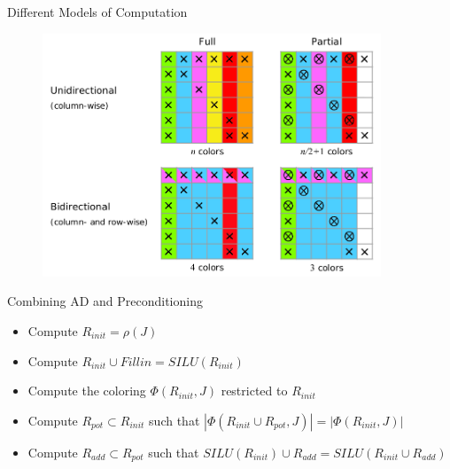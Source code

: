 \documentclass{beamer}
\begin{document}
\begin{frame}{Different Models of Computation}
\begin{figure}
\centering
\includegraphics[width=0.9\textwidth]{fullvsPart}
\end{figure}
\end{frame}

\begin{frame}{Combining AD and Preconditioning}
\begin{itemize}
\item Compute $R_{init} = \rho(J)$
\item Compute $R_{init} \cup Fillin = SILU(R_{init})$
\item Compute the coloring $\Phi (R_{init}, J)$ restricted to $R_{init}$
\item Compute $R_{pot} \subset R_{init}$ such that $|\Phi(R_{init}\cup R_{pot},J)| = |\Phi (R_{init}, J)|$
\item Compute $R_{add} \subset R_{pot}$ such that $SILU(R_{init})\cup R_{add} = SILU(R_{init}\cup R_{add})$
\end{itemize}
\end{frame}
\end{document}
